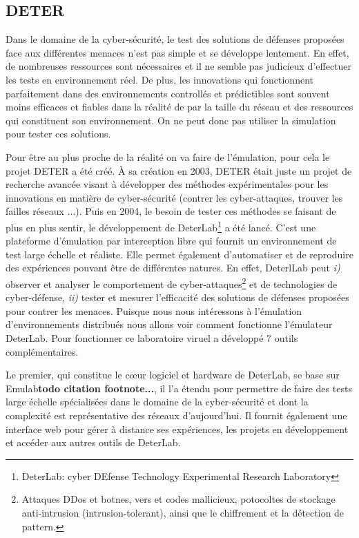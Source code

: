 \subsection{DETER}

Dans le domaine de la cyber-sécurité, le test des solutions de défenses
proposées face aux différentes menaces n'est pas simple et se développe
lentement. En effet, de nombreuses ressources sont nécessaires et il ne semble
pas judicieux d'effectuer les tests en environnement réel. De plus, les
innovations qui fonctionnent parfaitement dans des environnements controllés et
prédictibles sont souvent moins efficaces et fiables dans la réalité de par la
taille du réseau et des ressources qui constituent son environnement. On
ne peut donc pas utiliser la simulation pour tester ces solutions.

Pour être au plus proche de la réalité on va faire de l'émulation, pour cela le
projet DETER \citep{DETER_Project, DETER_benzel2011science,
  DETER_mirkovic2010deter} a été créé. À sa création en 2003, DETER était juste
un projet de recherche avancée visant à développer des méthodes expérimentales
pour les innovations en matière de cyber-sécurité (contrer les cyber-attaques,
trouver les failles réseaux ...). Puis en 2004, le besoin de tester ces méthodes
se faisant de plus en plus sentir, le développement de
DeterLab\footnote{DeterLab: cyber DEfense Technology Experimental Research
  Laboratory} a été lancé. C'est une plateforme d'émulation par interception
libre qui fournit un environnement de test large échelle et réaliste. Elle
permet également d'automatiser et de reproduire des expériences pouvant être de
différentes natures. En effet, DeterlLab peut \textit{i)} observer et analyser
le comportement de cyber-attaques\footnote{ Attaques DDos et botnes, vers et
  codes mallicieux, potocoltes de stockage anti-intrusion (intrusion-tolerant),
  ainsi que le chiffrement et la détection de pattern.} et de technologies de
cyber-défense, \textit{ii)} tester et mesurer l'efficacité des solutions de
défenses proposées pour contrer les menaces. Puisque nous nous intéressons à
l'émulation d'environnements distribués nous allons voir comment fonctionne
l'émulateur DeterLab. Pour fonctionner ce laboratoire viruel a développé 7
outils complémentaires.

Le premier, qui constitue le c\oe ur logiciel et hardware de DeterLab, se base sur
Emulab\textbf{todo citation footnote...}, il l'a étendu pour permettre de faire
des tests large échelle spécialisées dans le domaine de la cyber-sécurité et
dont la complexité est représentative des réseaux d'aujourd'hui. Il fournit
également une interface web pour gérer à distance ses expériences, les projets
en développement et accéder aux autres outils de DeterLab.

